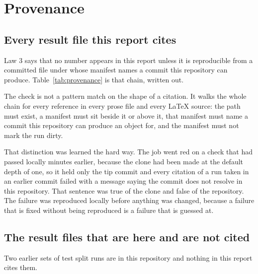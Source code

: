 \chapter{Provenance}
\label{app:provenance}

\section{Every result file this report cites}

Law 3 says that no number appears in this report unless it is reproducible from
a committed file under  whose manifest names a commit
this repository can produce. Table~\ref{tab:provenance} is that chain, written
out.

\begin{center}
\small

\label{tab:provenance}
\end{center}

The check is not a pattern match on the shape of a citation. It walks the whole
chain for every reference in every prose file and every LaTeX source: the path
must exist, a manifest must sit beside it or above it, that manifest must name a
commit this repository can produce an object for, and the manifest must not mark
the run dirty.

That distinction was learned the hard way. The job went red on a check that had
passed locally minutes earlier, because the clone had been made at the default
depth of one, so it held only the tip commit and every citation of a run taken in
an earlier commit failed with a message saying the commit does not resolve in
this repository. That sentence was true of the clone and false of the repository.
The failure was reproduced locally before anything was changed, because a
failure that is fixed without being reproduced is a failure that is guessed at.

\section{The result files that are here and are not cited}

Two earlier sets of test split runs are in this repository and nothing in this
report cites them.

